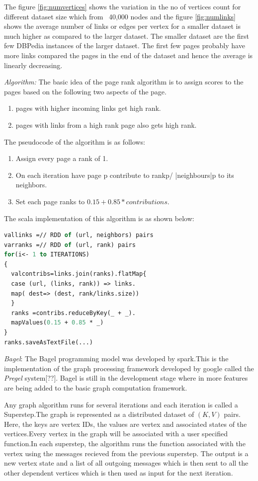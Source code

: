 \documentclass{article}
\begin{document}
The figure \ref{fig:numvertices} shows the variation in the no of vertices count for different dataset size which from ~40,000 nodes and the figure \ref{fig:numlinks} shows  the average number of links or edges per vertex for a smaller dataset is much higher as compared to the larger dataset. The smaller dataset are the first few DBPedia instances of the larger dataset. The first few pages probably have more links compared the pages in the end of the dataset and hence the average is linearly decreasing.


\emph{Algorithm:}
The basic idea of the page rank algorithm is to assign scores to the pages based on the following two aspects of the page.
	\begin{enumerate}
		\item {\centering pages with higher incoming links get high rank.}
		 \item {\centering pages with links from a high rank page also gets high rank.}
	\end{enumerate}

The pseudocode of the algorithm is as follows:
\begin{enumerate}
	\item {\centering Assign every page a rank of 1.}
	\item {\centering On each iteration have page p contribute to rankp/ |neighbours|p to its neighbors.}
	\item {\centering Set each page ranks to \(0.15 + 0.85  *  contributions\)}.
	\end{enumerate}   
	
The scala implementation of this algorithm is as shown below:
\begin{lstlisting}[language=ML]
vallinks =// RDD of (url, neighbors) pairs
varranks =// RDD of (url, rank) pairs
for(i<- 1 to ITERATIONS) 
{
  valcontribs=links.join(ranks).flatMap{
  case (url, (links, rank)) => links.
  map( dest=> (dest, rank/links.size))
  }
  ranks =contribs.reduceByKey(_ + _).
  mapValues(0.15 + 0.85 * _)
}
ranks.saveAsTextFile(...) 
\end{lstlisting}	
     
\emph{Bagel}:
The Bagel programming model was developed by spark.This is the implementation of the graph processing framework developed by google called the \emph{Pregel} system[??]. Bagel is still in the development stage where in more features are being added to the basic graph computation framework.

Any graph algorithm runs for several iterations and each iteration is called a Superstep.The graph is represented as a distributed dataset of $(K,V)$ pairs.  Here, the keys are vertex IDs, the values are vertex and associated states of the vertices.Every vertex in the graph will be associated with a user specified function.In each superstep, the algorithm runs the function associated with the vertex using the messages recieved from the previous superstep. The output is a new vertex state and a list of all outgoing messages which is then sent to all the other dependent vertices which is then used as input for the next iteration.
\end{document}
